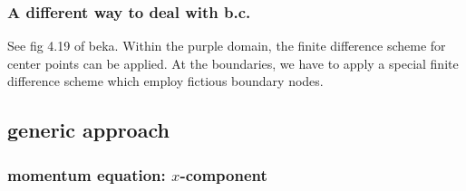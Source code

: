 \subsubsection{A different way to deal with b.c.}

See fig 4.19 of beka. 
Within the purple domain, the
finite difference scheme for center points can be applied. At the boundaries, we have to apply a
special finite difference scheme which employ fictious boundary nodes.






\subsection{generic approach}

\subsubsection{momentum equation: $x$-component}

